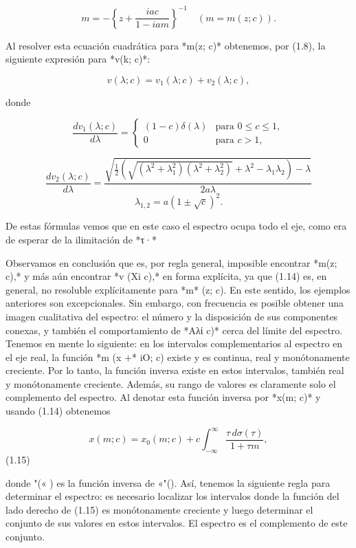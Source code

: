 \documentclass[11pt,a4paper]{article}
\begin{document}
$$m = -\left\{z + \frac{iac}{1 - iam}\right\}^{-1} \quad (m = m(z; c)).$$

Al resolver esta ecuación cuadrática para *m(z; c)* obtenemos, por (1.8), la siguiente expresión para *v(k; c)*:

$$v(\lambda; c) = v_1(\lambda; c) + v_2(\lambda; c),$$

donde

$$\frac{dv_1(\lambda;c)}{d\lambda} = \begin{cases} (1-c)\delta(\lambda) & \text{para } 0 \leqslant c \leqslant 1, \\ 0 & \text{para } c > 1, \end{cases}$$

$$\frac{dv_2(\lambda;c)}{d\lambda} = \frac{\sqrt{\frac{1}{2} \left(\sqrt{\left(\lambda^2 + \lambda_1^2\right) \left(\lambda^2 + \lambda_2^2\right)} + \lambda^2 - \lambda_1 \lambda_2\right) - \lambda}}{2a\lambda}$$
$$\lambda_{1,2} = a \left(1 \pm \sqrt{c}\right)^2.$$

De estas fórmulas vemos que en este caso el espectro ocupa todo el eje, como era de esperar de la ilimitación de *τ·*

Observamos en conclusión que es, por regla general, imposible encontrar *m(z; c),* y más aún encontrar *v (Xi c),* en forma explícita, ya que (1.14) es, en general, no resoluble explícitamente para *m* (z; c). En este sentido, los ejemplos anteriores son excepcionales. Sin embargo, con frecuencia es posible obtener una imagen cualitativa del espectro: el número y la disposición de sus componentes conexas, y también el comportamiento de *Αλί c)* cerca del límite del espectro. Tenemos en mente lo siguiente: en los intervalos complementarios al espectro en el eje real, la función *m (x +* iO; c) existe y es continua, real y monótonamente creciente. Por lo tanto, la función inversa existe en estos intervalos, también real y monótonamente creciente. Además, su rango de valores es claramente solo el complemento del espectro. Al denotar esta función inversa por *x(m; c)* y usando (1.14) obtenemos

$$x(m; c) = x_0(m; c) + c \int_{-\infty}^{\infty} \frac{\tau \, d\sigma(\tau)}{1 + \tau m},$$
 (1.15)

donde \*"(« ) es la función inversa de «"(\*). Así, tenemos la siguiente regla para determinar el espectro: es necesario localizar los intervalos donde la función del lado derecho de (1.15) es monótonamente creciente y luego determinar el conjunto de sus valores en estos intervalos. El espectro es el complemento de este conjunto.
\end{document}

